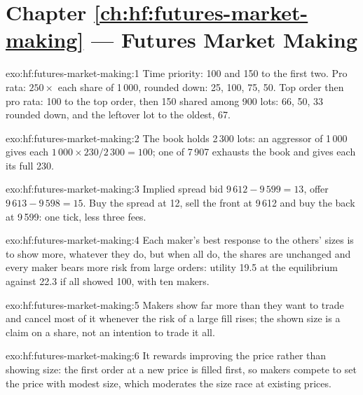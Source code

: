 \section*{Chapter \ref{ch:hf:futures-market-making} --- Futures Market Making}

\begin{solution}{exo:hf:futures-market-making:1}
Time priority: 100 and 150 to the first two. Pro rata: $250\times$ each share of 1\,000, rounded down: 25, 100, 75, 50. Top order then pro rata: 100
to the top order, then 150 shared among 900 lots: 66, 50, 33 rounded down, and the leftover lot to the oldest, 67.
\end{solution}

\begin{solution}{exo:hf:futures-market-making:2}
The book holds 2\,300 lots: an aggressor of 1\,000 gives each $1\,000\times230/2\,300=100$; one of 7\,907 exhausts the book and gives each its full
230.
\end{solution}

\begin{solution}{exo:hf:futures-market-making:3}
Implied spread bid $9\,612-9\,599=13$, offer $9\,613-9\,598=15$. Buy the spread at 12, sell the front at 9\,612 and buy the back at 9\,599:
one tick, less three fees.
\end{solution}

\begin{solution}{exo:hf:futures-market-making:4}
Each maker's best response to the others' sizes is to show more, whatever they do, but when all do, the shares are unchanged and every maker bears
more risk from large orders: utility 19.5 at the equilibrium against 22.3 if all showed 100, with ten makers.
\end{solution}

\begin{solution}{exo:hf:futures-market-making:5}
Makers show far more than they want to trade and cancel most of it whenever the risk of a large fill rises; the shown size is a claim on a share,
not an intention to trade it all.
\end{solution}

\begin{solution}{exo:hf:futures-market-making:6}
It rewards improving the price rather than showing size: the first order at a new price is filled first, so makers compete to set the price with
modest size, which moderates the size race at existing prices.
\end{solution}


